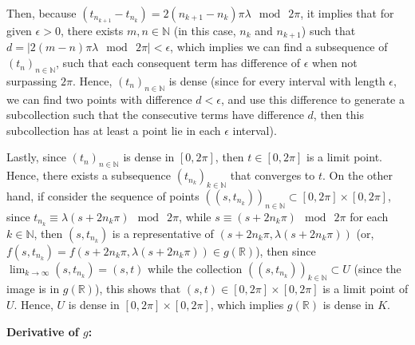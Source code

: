 \documentclass{article}
\begin{document}
\begin{itemize}
    Then, because $(t_{n_{k+1}}-t_{n_k}) = 2(n_{k+1}-n_k)\pi\lambda \mod\ 2\pi$, it implies that for given $\epsilon>0$, there exists $m,n\in\mathbb{N}$ (in this case, $n_{k}$ and $n_{k+1}$) such that $d = |2(m-n)\pi\lambda\mod\ 2\pi| < \epsilon$, which implies we can find a subsequence of $(t_n)_{n\in\mathbb{N}}$,
    such that each consequent term has difference of $\epsilon$ when not surpassing $2\pi$. Hence, $(t_n)_{n\in\mathbb{N}}$ is dense (since for every interval with length $\epsilon$, we can find two points with difference $d<\epsilon$, and use this difference to generate a subcollection such that the consecutive terms have difference $d$, then this subcollection has at least a point lie in each $\epsilon$ interval).

    Lastly, since $(t_n)_{n\in\mathbb{N}}$ is dense in $[0,2\pi]$, then $t\in [0,2\pi]$ is a limit point. Hence, there exists a subsequence $(t_{n_k})_{k\in\mathbb{N}}$ that converges to $t$.
    On the other hand, if consider the sequence of points $((s,t_{n_k}))_{n\in\mathbb{N}}\subset [0,2\pi]\times [0,2\pi]$, since $t_{n_k}\equiv \lambda(s+2n_k\pi)\mod\ 2\pi$, while $s\equiv (s+2n_k\pi)\mod\ 2\pi$ for each $k\in\mathbb{N}$, then $(s,t_{n_k})$ is a representative of $(s+2n_k\pi, \lambda(s+2n_k\pi))$ (or, $f(s,t_{n_k})=f(s+2n_k\pi, \lambda(s+2n_k\pi))\in g(\mathbb{R})$),
    then since $\lim_{k\rightarrow\infty} (s,t_{n_k}) = (s,t)$ while the collection $((s,t_{n_k}))_{k\in\mathbb{N}}\subset U$ (since the image is in $g(\mathbb{R})$), this shows that $(s,t)\in [0,2\pi]\times [0,2\pi]$ is a limit point of $U$. Hence, $U$ is dense in $[0,2\pi]\times [0,2\pi]$, which implies $g(\mathbb{R})$ is dense in $K$.

    \hfil

    \textbf{Derivative of $g$:}


\end{itemize}
\end{document}
